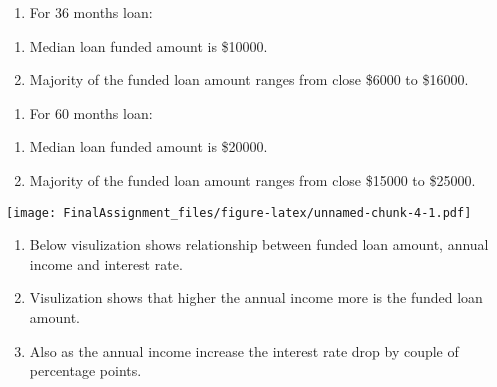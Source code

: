 \documentclass[]{article}
\newenvironment{Shaded}{\begin{snugshade}}{\end{snugshade}}
\newcommand{\DataTypeTok}[1]{\textcolor[rgb]{0.13,0.29,0.53}{#1}}
\newcommand{\KeywordTok}[1]{\textcolor[rgb]{0.13,0.29,0.53}{\textbf{#1}}}
\newcommand{\NormalTok}[1]{#1}
\newcommand{\OperatorTok}[1]{\textcolor[rgb]{0.81,0.36,0.00}{\textbf{#1}}}
\newcommand{\StringTok}[1]{\textcolor[rgb]{0.31,0.60,0.02}{#1}}
\providecommand{\tightlist}{%
  \setlength{\itemsep}{0pt}\setlength{\parskip}{0pt}}
\begin{document}
\begin{enumerate}
\def\labelenumi{\arabic{enumi}.}
\setcounter{enumi}{2}
\tightlist
\item
  For 36 months loan:
\end{enumerate}

\begin{enumerate}
\def\labelenumi{\alph{enumi}.}
\tightlist
\item
  Median loan funded amount is \$10000.
\item
  Majority of the funded loan amount ranges from close \$6000 to
  \$16000.
\end{enumerate}

\begin{enumerate}
\def\labelenumi{\arabic{enumi}.}
\setcounter{enumi}{3}
\tightlist
\item
  For 60 months loan:
\end{enumerate}

\begin{enumerate}
\def\labelenumi{\alph{enumi}.}
\tightlist
\item
  Median loan funded amount is \$20000.
\item
  Majority of the funded loan amount ranges from close \$15000 to
  \$25000.
\end{enumerate}

\begin{Shaded}
\end{Shaded}

\texttt{[image: FinalAssignment\_files/figure-latex/unnamed-chunk-4-1.pdf]}

\begin{enumerate}
\def\labelenumi{\arabic{enumi}.}
\tightlist
\item
  Below visulization shows relationship between funded loan amount,
  annual income and interest rate.
\item
  Visulization shows that higher the annual income more is the funded
  loan amount.
\item
  Also as the annual income increase the interest rate drop by couple of
  percentage points.
\end{enumerate}
\end{document}
